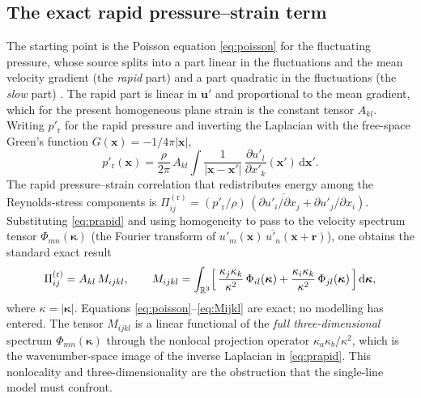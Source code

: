 \documentclass[lineno]{JFM-FLM_Au}
\begin{document}
\subsection{The exact rapid pressure--strain term}\label{sec:exact-pi}

The starting point is the Poisson equation \eqref{eq:poisson} for the
fluctuating pressure, whose source splits into a part linear in the
fluctuations and the mean velocity gradient (the \emph{rapid} part) and a
part quadratic in the fluctuations (the \emph{slow} part)
\citep{Pope2000}. The rapid part is linear in $\boldsymbol{u}'$ and
proportional to the mean gradient, which for the present homogeneous
plane strain is the constant tensor $A_{kl}$. Writing
$p'_{\mathrm r}$ for the rapid pressure and inverting the Laplacian with the
free-space Green's function $G(\boldsymbol{x})=-1/4\pi|\boldsymbol{x}|$,
\begin{equation}
  p'_{\mathrm r}(\boldsymbol{x})
  = \frac{\rho}{2\pi}\,A_{kl}\!\int
    \frac{1}{|\boldsymbol{x}-\boldsymbol{x}'|}\,
    \frac{\partial u'_l}{\partial x'_k}(\boldsymbol{x}')\,
    \mathrm{d}\boldsymbol{x}' .
  \label{eq:prapid}
\end{equation}
The rapid pressure--strain correlation that redistributes energy among the
Reynolds-stress components is
$\Pi^{(\mathrm r)}_{ij}
   = \overline{(p'_{\mathrm r}/\rho)\,(\partial u'_i/\partial x_j
     + \partial u'_j/\partial x_i)}$.
Substituting \eqref{eq:prapid} and using homogeneity to pass to the
velocity spectrum tensor
$\Phi_{mn}(\boldsymbol{\kappa})$
(the Fourier transform of $\overline{u'_m(\boldsymbol{x})\,
u'_n(\boldsymbol{x}+\boldsymbol{r})}$),
one obtains the standard exact result
\citep{BatchelorProudman1954,Crow1968,HuntCarruthers1990}
\begin{equation}
  \Pi^{(\mathrm r)}_{ij}
  = A_{kl}\,M_{ijkl},
  \qquad
  M_{ijkl}
  = \int_{\mathbb{R}^3}
    \Bigl[\,
      \frac{\kappa_j\kappa_k}{\kappa^2}\,\Phi_{il}(\boldsymbol{\kappa})
      + \frac{\kappa_i\kappa_k}{\kappa^2}\,\Phi_{jl}(\boldsymbol{\kappa})
    \,\Bigr]\,\mathrm{d}\boldsymbol{\kappa},
  \label{eq:Mijkl}
\end{equation}
where $\kappa=|\boldsymbol{\kappa}|$. Equations
\eqref{eq:poisson}--\eqref{eq:Mijkl} are exact; no modelling has entered. The
tensor $M_{ijkl}$ is a linear functional of the \emph{full three-dimensional}
spectrum $\Phi_{mn}(\boldsymbol{\kappa})$ through the nonlocal projection
operator $\kappa_a\kappa_b/\kappa^2$, which is the wavenumber-space image of
the inverse Laplacian in \eqref{eq:prapid}. This nonlocality and
three-dimensionality are the obstruction that the single-line model must
confront.
\end{document}
